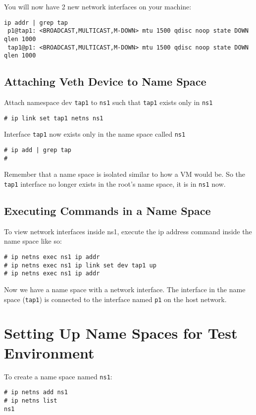 \documentclass[letter]{article}
\begin{document}
{{\begin{appendices}
{You will now have 2 new network interfaces on your machine:
\begin{lstlisting} 
ip addr | grep tap
 p1@tap1: <BROADCAST,MULTICAST,M-DOWN> mtu 1500 qdisc noop state DOWN qlen 1000
 tap1@p1: <BROADCAST,MULTICAST,M-DOWN> mtu 1500 qdisc noop state DOWN qlen 1000
\end{lstlisting}
		
\subsection{Attaching Veth Device to Name Space}
Attach namespace dev \texttt{tap1} to \texttt{ns1} such that \texttt{tap1} exists only in \texttt{ns1}
\begin{lstlisting}
# ip link set tap1 netns ns1
\end{lstlisting}
Interface \texttt{tap1} now exists only in the name space called \texttt{ns1}
\begin{lstlisting}
# ip add | grep tap
#
\end{lstlisting}

Remember that a name space is isolated similar to how a VM would be. So the \texttt{tap1} interface no longer exists in the root's name space, it is in \texttt{ns1} now.

\subsection{Executing Commands in a Name Space}
To view network interfaces inside ns1, execute the ip address  command inside the name space like so:
\begin{lstlisting}
# ip netns exec ns1 ip addr
# ip netns exec ns1 ip link set dev tap1 up
# ip netns exec ns1 ip addr
\end{lstlisting}

Now we have a name space with a network interface. The interface in the name space (\texttt{tap1}) is connected to the interface named \texttt{p1} on the host network. 

\section{Setting Up Name Spaces for Test Environment}
\label{sec:OVSandNS}

To create a name space named \texttt{ns1}:
\begin{lstlisting}
# ip netns add ns1
# ip netns list
ns1
\end{lstlisting}

}
\end{appendices}}}
\end{document}
